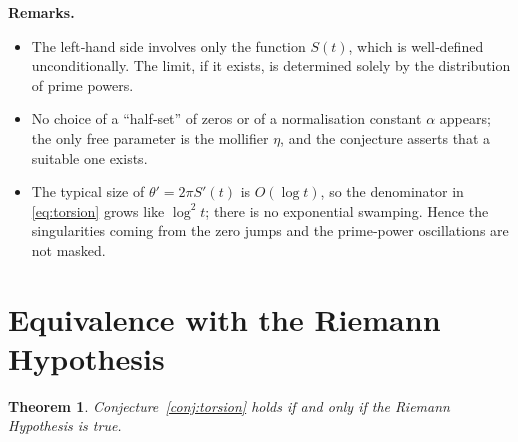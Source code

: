 \documentclass[12pt,a4paper]{article}
\newtheorem{theorem}{Theorem}[section]
\begin{document}
\noindent
\textbf{Remarks.}
\begin{itemize}
\item The left‑hand side involves only the function \(S(t)\), which is well‑defined
unconditionally.  The limit, if it exists, is determined solely by the distribution of prime
powers.
\item No choice of a ``half‑set'' of zeros or of a normalisation constant \(\alpha\) appears;
the only free parameter is the mollifier \(\eta\), and the conjecture asserts that a suitable
one exists.
\item The typical size of \(\theta' = 2\pi S'(t)\) is \(O(\log t)\), so the denominator in
\eqref{eq:torsion} grows like \(\log^2 t\); there is no exponential swamping.  Hence the
singularities coming from the zero jumps and the prime‑power oscillations are not masked.
\end{itemize}

\section{Equivalence with the Riemann Hypothesis}

\begin{theorem}
Conjecture~\ref{conj:torsion} holds if and only if the Riemann Hypothesis is true.
\end{theorem}
\end{document}
